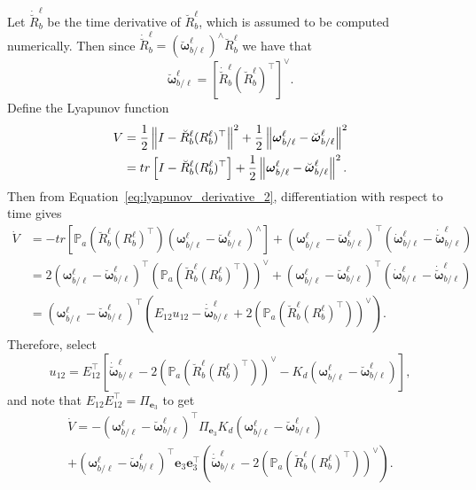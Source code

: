 Let $\dot{\breve{R}}_b^\ell$ be the time derivative of $\breve{R}_b^\ell$, which is assumed to be computed numerically.  Then since $\dot{\breve{R}}_b^\ell = (\breve{\boldsymbol{\omega}}_{b/\ell}^\ell)^\wedge\breve{R}_b^\ell$ we have that
\[
\breve{\boldsymbol{\omega}}_{b/\ell}^\ell = \left[\dot{\breve{R}}_b^\ell(\breve{R}_b^\ell)^\top \right]^\vee.
\]
Define the Lyapunov function
\begin{align*}
V &= \frac{1}{2}\left\|I-\breve{R}_b^\ell (R_b^\ell)^\top\right\|^2 + \frac{1}{2}\left\|\boldsymbol{\omega}_{b/\ell}^\ell-\breve{\boldsymbol{\omega}}_{b/\ell}^\ell\right\|^2 \\
  &= tr\left[I-\breve{R}_b^\ell (R_b^\ell)^\top\right]+ \frac{1}{2}\left\|\boldsymbol{\omega}_{b/\ell}^\ell-\breve{\boldsymbol{\omega}}_{b/\ell}^\ell\right\|^2.
\end{align*}
Then from Equation~\eqref{eq:lyapunov_derivative_2}, differentiation with respect to time gives
\begin{align*}
\dot{V} &= -tr\left[  \mathbb{P}_a\left(\breve{R}_b^\ell (R_b^\ell)^\top\right)\left(\boldsymbol{\omega}_{b/\ell}^\ell-\breve{\boldsymbol{\omega}}_{b/\ell}^\ell\right)^\wedge \right] + \left(\boldsymbol{\omega}_{b/\ell}^\ell-\breve{\boldsymbol{\omega}}_{b/\ell}^\ell\right)^\top\left(\dot{\boldsymbol{\omega}}_{b/\ell}^\ell-\dot{\breve{\boldsymbol{\omega}}}_{b/\ell}^\ell\right) \\
&= 2\left(\boldsymbol{\omega}_{b/\ell}^\ell-\breve{\boldsymbol{\omega}}_{b/\ell}^\ell\right)^\top \left( \mathbb{P}_a(\breve{R}_b^\ell (R_b^\ell)^\top)\right)^\vee + \left(\boldsymbol{\omega}_{b/\ell}^\ell-\breve{\boldsymbol{\omega}}_{b/\ell}^\ell\right)^\top\left(\dot{\boldsymbol{\omega}}_{b/\ell}^\ell-\dot{\breve{\boldsymbol{\omega}}}_{b/\ell}^\ell\right) \\ 
&= \left(\boldsymbol{\omega}_{b/\ell}^\ell-\breve{\boldsymbol{\omega}}_{b/\ell}^\ell\right)^\top \left( E_{12}u_{12}-\dot{\breve{\boldsymbol{\omega}}}_{b/\ell}^\ell + 2\left( \mathbb{P}_a(\breve{R}_b^\ell (R_b^\ell)^\top)\right)^\vee \right).
\end{align*}
Therefore, select
\[
u_{12} = E_{12}^\top\left[\dot{\breve{\boldsymbol{\omega}}}_{b/\ell}^\ell - 2\left( \mathbb{P}_a(\breve{R}_b^\ell (R_b^\ell)^\top)\right)^\vee -  K_d\left(\boldsymbol{\omega}_{b/\ell}^\ell-\breve{\boldsymbol{\omega}}_{b/\ell}^\ell\right) \right],
\]
and note that $E_{12}E_{12}^\top = \Pi_{\mathbf{e}_3}$ to get
\begin{multline*}
\dot{V} = - \left(\boldsymbol{\omega}_{b/\ell}^\ell-\breve{\boldsymbol{\omega}}_{b/\ell}^\ell\right)^\top \Pi_{\mathbf{e}_3} K_d\left(\boldsymbol{\omega}_{b/\ell}^\ell-\breve{\boldsymbol{\omega}}_{b/\ell}^\ell\right) \\
   + \left(\boldsymbol{\omega}_{b/\ell}^\ell-\breve{\boldsymbol{\omega}}_{b/\ell}^\ell\right)^\top \mathbf{e}_3\mathbf{e}_3^\top \left(\dot{\breve{\boldsymbol{\omega}}}_{b/\ell}^\ell - 2\left( \mathbb{P}_a(\breve{R}_b^\ell (R_b^\ell)^\top)\right)^\vee\right).
\end{multline*}

